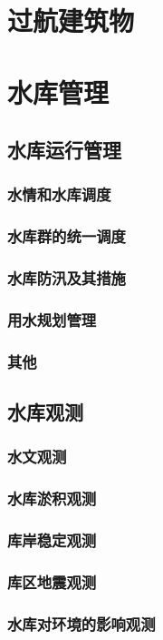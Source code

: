 \documentclass[UTF8]{../../ApplicationUniverse}
\begin{document}
\section{过航建筑物}
\section{水库管理}
    \subsection{水库运行管理}
        \subsubsection{水情和水库调度}
        \subsubsection{水库群的统一调度}
        \subsubsection{水库防汛及其措施}
        \subsubsection{用水规划管理}
        \subsubsection{其他}
    \subsection{水库观测}
        \subsubsection{水文观测}
        \subsubsection{水库淤积观测}
        \subsubsection{库岸稳定观测}
        \subsubsection{库区地震观测}
        \subsubsection{水库对环境的影响观测}
\end{document}
